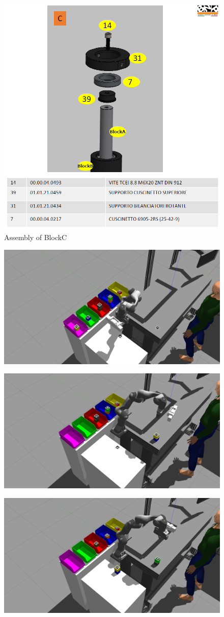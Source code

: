 \begin{figure} [h]
\centering
\includegraphics[width=0.6
\textwidth]{figures/Magistrale/ass_obj_3}
\caption[BlockC Assembly]{Assembly of BlockC
\label{fig:ass_obj_3}}
\end{figure} 

\begin{figure} [h]
\centering
\includegraphics[width=0.6
\textwidth]{figures/Magistrale/ass_1}
\caption[Initial Assembly Test Environment]{
\label{fig:ass_1}}
\end{figure} 

\begin{figure} [h]
\centering
\includegraphics[width=0.6
\textwidth]{figures/Magistrale/ass_2}
\caption[BlockA Assembly Simulation]{
\label{fig:ass_2}}
\end{figure} 

\begin{figure} [h]
\centering
\includegraphics[width=0.6
\textwidth]{figures/Magistrale/ass_3}
\caption[First Part of BlockB Assembly Simulation]{
\label{fig:ass_3}}
\end{figure} 

